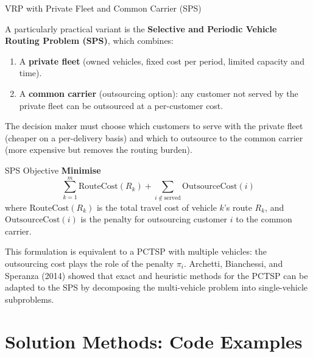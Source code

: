 \documentclass[aspectratio=169,10pt]{beamer}
\begin{document}
\begin{frame}[allowframebreaks]{VRP with Private Fleet and Common Carrier (SPS)}

  A particularly practical variant is the \textbf{Selective and Periodic
  Vehicle Routing Problem (SPS)}, which combines:
  \begin{enumerate}
    \item A \textbf{private fleet} (owned vehicles, fixed cost per period,
          limited capacity and time).
    \item A \textbf{common carrier} (outsourcing option): any customer not
          served by the private fleet can be outsourced at a per-customer
          cost.
  \end{enumerate}

  \medskip
  The decision maker must choose which customers to serve with the private
  fleet (cheaper on a per-delivery basis) and which to outsource to the
  common carrier (more expensive but removes the routing burden).

  \medskip
  \begin{block}{SPS Objective}
    \textbf{Minimise}
    \[
      \sum_{k=1}^{m} \text{RouteCost}(R_k)
      + \sum_{i \notin \text{served}} \text{OutsourceCost}(i)
    \]
    where $\text{RouteCost}(R_k)$ is the total travel cost of vehicle $k$'s
    route $R_k$, and $\text{OutsourceCost}(i)$ is the penalty for
    outsourcing customer $i$ to the common carrier.
  \end{block}

  \medskip
  This formulation is equivalent to a PCTSP with multiple vehicles:
  the outsourcing cost plays the role of the penalty $\pi_i$.
  Archetti, Bianchessi, and Speranza (2014) showed that exact and
  heuristic methods for the PCTSP can be adapted to the SPS by
  decomposing the multi-vehicle problem into single-vehicle subproblems.

\end{frame}

\section{Solution Methods: Code Examples}
\end{document}
